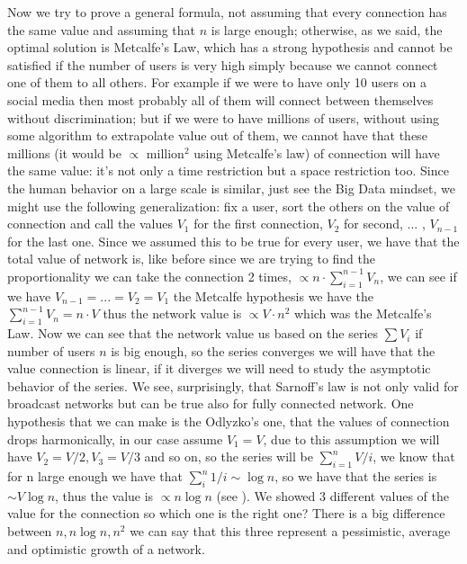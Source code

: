 \documentclass[12pt, a4page]{article}
\begin{document}
Now we try to prove a general formula, not %
assuming that every connection has the same value and assuming that $n$ is large enough; otherwise, as we said, %
the optimal solution is Metcalfe's Law, which has a strong hypothesis and cannot be satisfied if the number of users is very high simply because we cannot connect one of them to all others.
For example if we %
were to have only 10 users on a social media then most probably all of them will connect between themselves without discrimination; but if we were to have millions of users, without using some algorithm to extrapolate value out of them, we cannot have that these millions (it would be $\propto$ million$^2$ using Metcalfe's law) of connection will have the same value: it's not only a time restriction but a space restriction too. Since the human behavior on a large scale is similar, just see the Big Data mindset, we might use the following generalization:
fix a user, sort the others on the value of connection and call the values $V_1$ for the first connection, $V_2$ for second, ... , $V_{n-1}$ for the last one.
\newline
Since we assumed this to be true for every user, we have that the total value of network is, like before since we are trying to find the proportionality we can take the connection 2 times, $\propto n \cdot \sum_{i=1}^{n-1} V_n$, we can see if we have $V_{n-1}=...=V_2=V_1$ the Metcalfe hypothesis we have the $ \sum_{i=1}^{n-1} V_n = n\cdot V$ thus the network value is $\propto V \cdot n^2$ which was the Metcalfe's Law.
Now we can see that the network value us based on the series $\sum V_i$ if number of users $n$ is big enough, so the series converges we will have that the value connection is linear, if it diverges we will need to study the asymptotic behavior of the series.
We see, surprisingly, that Sarnoff's law is not only valid for broadcast networks but can be true also for fully connected network.\newline
One hypothesis that we can make is the Odlyzko's one, that the values of connection drops harmonically, in our case assume $V_1 = V$, due to this assumption we will have $V_2 = V/2, V_3 = V/3$ and so on, so the series will be $\sum_{i=1}^n V/i$, we know that for n large enough we have that $\sum_i^n 1/i \sim \log n$, so we have that the series is $\sim V \log n$, thus the value is $\propto n \log n$ (see \cite{OdlyzkoLaw}).\newline
We showed 3 different values of the value for the connection so which one is the right one? There is a big difference between $n, n\log n, n^2$ we can say that this three represent a pessimistic, average and optimistic growth of a network.
\end{document}
